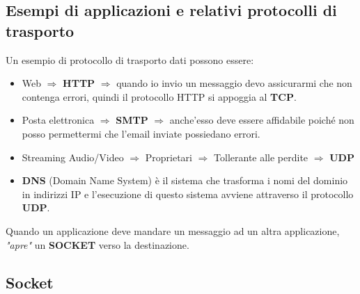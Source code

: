 \documentclass[a4paper]{article}
\begin{document}
\subsection{Esempi di applicazioni e relativi protocolli di trasporto}

Un esempio di protocollo di trasporto dati possono essere:

\begin{itemize}
    \item Web $\Longrightarrow$ \textbf{HTTP} $\Longrightarrow$ quando io invio un messaggio devo assicurarmi che non contenga errori, quindi il protocollo HTTP si appoggia al \textbf{TCP}.
    \item Posta elettronica $\Longrightarrow$ \textbf{SMTP} $\Longrightarrow$ anche'esso deve essere affidabile poiché non posso permettermi che l'email inviate possiedano errori.
    \item Streaming Audio/Video $\Longrightarrow$ Proprietari $\Longrightarrow$ Tollerante alle perdite $\Longrightarrow$ \textbf{UDP}
    \item \textbf{DNS} (Domain Name System) è il sistema che trasforma i nomi del dominio in indirizzi IP e l'esecuzione di questo sistema avviene attraverso il protocollo \textbf{UDP}.
\end{itemize}
Quando un applicazione deve mandare un messaggio ad un altra applicazione, \textit{"apre"} un \textbf{SOCKET} verso la destinazione.

\subsection{Socket}
\end{document}
